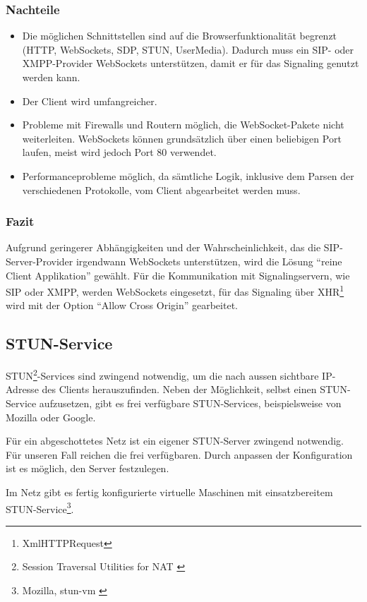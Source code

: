 		\subsubsection{Nachteile}
		\begin{itemize}
			\item Die möglichen Schnittstellen sind auf die Browserfunktionalität
			begrenzt (HTTP, WebSockets, SDP, STUN, UserMedia). Dadurch
			muss ein SIP- oder XMPP-Provider WebSockets unterstützen, damit er für das
			Signaling genutzt werden kann.
			\item Der Client wird umfangreicher.
			\item Probleme mit Firewalls und Routern möglich, die WebSocket-Pakete nicht
			weiterleiten. WebSockets können grundsätzlich über einen beliebigen Port laufen, meist wird jedoch Port 80 verwendet.
			\item Performanceprobleme möglich, da sämtliche Logik, inklusive dem Parsen
			der verschiedenen Protokolle, vom Client abgearbeitet werden muss.
		\end{itemize}

		\subsubsection{Fazit}
			Aufgrund geringerer Abhängigkeiten und der Wahrscheinlichkeit, das die
			SIP-Server-Provider irgendwann WebSockets unterstützen, wird die Lösung
			"`reine Client Applikation"' gewählt.
			Für die Kommunikation mit Signalingservern, wie SIP oder XMPP, werden
			WebSockets eingesetzt, für das Signaling über XHR\footnote{XmlHTTPRequest}
			wird mit der Option "`Allow Cross Origin"' gearbeitet.

	\subsection{STUN-Service}
		STUN\footnote{Session Traversal Utilities for NAT \cite{IETF-STUN-RFC}}-Services sind zwingend
		notwendig, um die nach aussen sichtbare IP-Adresse des Clients herauszufinden.
		Neben der Möglichkeit, selbst einen STUN-Service aufzusetzen, gibt es frei
		verfügbare STUN-Services, beispielsweise von Mozilla oder Google.

		Für ein abgeschottetes Netz ist ein eigener STUN-Server zwingend notwendig.
		Für unseren Fall reichen die frei verfügbaren. Durch anpassen der
		Konfiguration ist es möglich, den Server festzulegen.

		Im Netz gibt es fertig konfigurierte virtuelle Maschinen mit einsatzbereitem
		STUN-Service\footnote{Mozilla, stun-vm \cite{Mozilla-STUN-VM}}.

